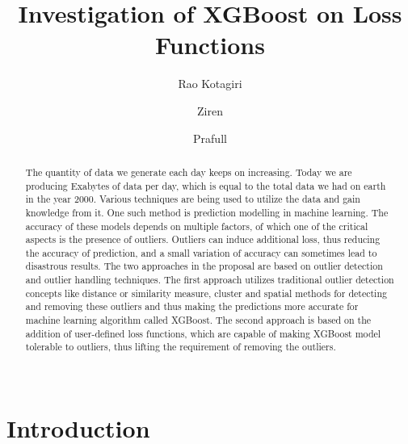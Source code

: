 \documentclass[runningheads]{llncs}
\begin{document}
%
\title{Investigation of XGBoost on Loss Functions }

%
%
\author{Rao Kotagiri \and
Ziren \and
Prafull}
%
%
%
\maketitle              %
%
\begin{abstract}
\paragraph{} The quantity of data we generate each day keeps on increasing. Today we are producing Exabytes of data per day, which is equal to the total data we had on earth in the year 2000. Various techniques are being used to utilize the data and gain knowledge from it. One such method is prediction modelling in machine learning. The accuracy of these models depends on multiple factors, of which one of the critical aspects is the presence of outliers. Outliers can induce additional loss, thus reducing the accuracy of prediction, and a small variation of accuracy can sometimes lead to disastrous results. The two approaches in the proposal are based on outlier detection and outlier handling techniques. The first approach utilizes traditional outlier detection concepts like distance or similarity measure, cluster and spatial methods for detecting and removing these outliers and thus making the predictions more accurate for machine learning algorithm called XGBoost. The second approach is based on the addition of user-defined loss functions, which are capable of making XGBoost model tolerable to outliers, thus lifting the requirement of removing the outliers. \\
\\


\end{abstract}
%
%
%
\section{Introduction}
\end{document}
